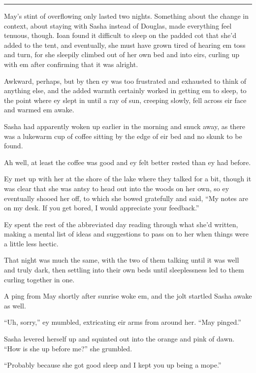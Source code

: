 \begin{center}\rule{0.5\linewidth}{0.5pt}\end{center}

May's stint of overflowing only lasted two nights. Something about the change in context, about staying with Sasha instead of Douglas, made everything feel tenuous, though. Ioan found it difficult to sleep on the padded cot that she'd added to the tent, and eventually, she must have grown tired of hearing em toss and turn, for she sleepily climbed out of her own bed and into eirs, curling up with em after confirming that it was alright.

Awkward, perhaps, but by then ey was too frustrated and exhausted to think of anything else, and the added warmth certainly worked in getting em to sleep, to the point where ey slept in until a ray of sun, creeping slowly, fell across eir face and warmed em awake.

Sasha had apparently woken up earlier in the morning and snuck away, as there was a lukewarm cup of coffee sitting by the edge of eir bed and no skunk to be found.

Ah well, at least the coffee was good and ey felt better rested than ey had before.

Ey met up with her at the shore of the lake where they talked for a bit, though it was clear that she was antsy to head out into the woods on her own, so ey eventually shooed her off, to which she bowed gratefully and said, ``My notes are on my desk. If you get bored, I would appreciate your feedback.''

Ey spent the rest of the abbreviated day reading through what she'd written, making a mental list of ideas and suggestions to pass on to her when things were a little less hectic.

That night was much the same, with the two of them talking until it was well and truly dark, then settling into their own beds until sleeplessness led to them curling together in one.

A ping from May shortly after sunrise woke em, and the jolt startled Sasha awake as well.

``Uh, sorry,'' ey mumbled, extricating eir arms from around her. ``May pinged.''

Sasha levered herself up and squinted out into the orange and pink of dawn. ``How is she up before me?'' she grumbled.

``Probably because she got good sleep and I kept you up being a mope.''

